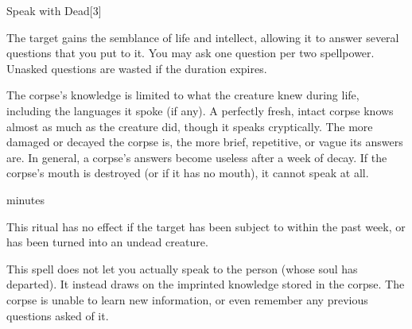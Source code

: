 \begin{spellsection}{Speak with Dead}[3]
    \begin{spellheader}
    \end{spellheader}
    \begin{spellcontent}
        \begin{spelltargetinginfo}
            \spellrng{\rngclose}
        \end{spelltargetinginfo}
        \begin{spelleffects}

            \spelleffect The target gains the semblance of life and intellect, allowing it to answer several questions that you put to it. You may ask one question per two spellpower. Unasked questions are wasted if the duration expires.

            The corpse's knowledge is limited to what the creature knew during life, including the languages it spoke (if any). A perfectly fresh, intact corpse knows almost as much as the creature did, though it speaks cryptically. The more damaged or decayed the corpse is, the more brief, repetitive, or vague its answers are. In general, a corpse's answers become useless after a week of decay. If the corpse's mouth is destroyed (or if it has no mouth), it cannot speak at all.

             minutes \dismissable
        \end{spelleffects}
    \end{spellcontent}
    \begin{spellfooter}
        \spellnotes This ritual has no effect if the target has been subject to  within the past week, or has been turned into an undead creature.

        \par This spell does not let you actually speak to the person (whose soul has departed). It instead draws on the imprinted knowledge stored in the corpse. The corpse is unable to learn new information, or even remember any previous questions asked of it.
    \end{spellfooter}
\end{spellsection}

